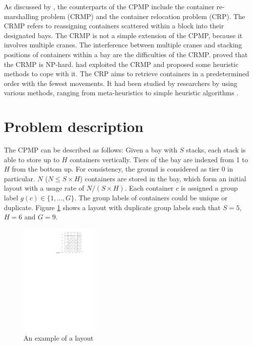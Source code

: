 \documentclass[review,3p,times,authoryear,12pt]{elsarticle}
\begin{document}
As discussed by \cite{Caserta2011}, the counterparts of the CPMP include the container re-marshalling problem (CRMP) and the container relocation problem (CRP). 
The CRMP refers to reassigning containers scattered within a block into their designated bays. 
The CRMP is not a simple extension of the CPMP, because it involves multiple cranes. 
The interference between multiple cranes and stacking positions of containers within a bay are the difficulties of the CRMP.
\cite{Caserta2011} proved that the CRMP is NP-hard. 
\cite{Kim1998, Kang2006Plan, Park2009Plan, Choe2011} had exploited the CRMP and proposed some heuristic methods to cope with it. 
The CRP aims to retrieve containers in a predetermined order with the fewest movements. 
It had been studied by researchers by using various methods, ranging from meta-heuristics to simple heuristic algorithms \citep{Kim2006A, Yang2006A, Caserta2009A,Caserta2009Applying,Lee2010A,Caserta2012AM, Forster2012A, Zhu2012Iter,Jin2015}.


\section{Problem description}
\label{sec:pd}

The CPMP can be described as follows: Given a bay with $S$ stacks, each stack is able to store up to $H$ containers vertically. 
Tiers of the bay are indexed from 1 to $H$ from the bottom up. 
For consistency, the ground is considered as tier 0 in particular.
$N$ ($N\le S\times H$) containers are stored in the bay, which form an initial layout with a usage rate of $N/(S\times H)$. 
Each container $c$ is assigned a group label $g(c)\in \{1,\dots,G\}$. 
The group labels of containers could be unique or duplicate. 
Figure \ref{fig3} shows a layout with duplicate group labels such that $S=5$, $H=6$ and $G=9$.

\begin{figure}[!htb]
\centering
\includegraphics[width=0.35\textwidth]{fig3.pdf}
\caption{An example of a layout}
\label{fig3}
\end{figure}
\end{document}
